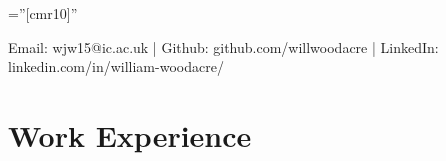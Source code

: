 \documentclass[a4paper,10pt]{article} %
\begin{document}
\pagestyle{empty} %

\font\fb=''[cmr10]'' %


\par{\bigskip\par} %


{\centering
  Email: wjw15@ic.ac.uk | Github: github.com/willwoodacre | LinkedIn: linkedin.com/in/william-woodacre/\par
}


\section{Work Experience}
\end{document}
